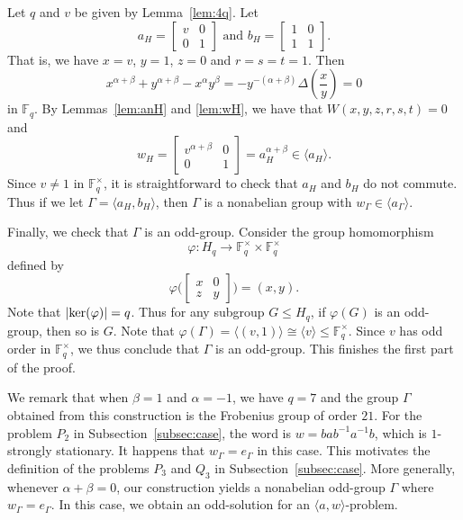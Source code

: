 \documentclass[11pt]{amsart}
\theoremstyle{definition}
\theoremstyle{definition}
\numberwithin{equation}{section}
\begin{document}
Let $q$ and $v$ be given by Lemma~\ref{lem:4q}. Let 
\begin{equation} a_H=\left[\begin{array}{cc} v& 0 \\ 0 & 1\end{array}\right] \mbox{ and } b_H=\left[\begin{array}{cc} 1 & 0 \\ 1 & 1\end{array}\right]. \end{equation}
That is, we have $x=v$, $y=1$, $z=0$ and $r=s=t=1$. Then
$$ x^{\alpha+\beta}+y^{\alpha+\beta}-x^\alpha y^\beta=-y^{-(\alpha+\beta)}\Delta\left(\frac{x}{y}\right)=0$$
in $\mathbb{F}_q$. By Lemmas~\ref{lem:anH} and \ref{lem:wH}, we have that $W(x,y,z,r,s,t)=0$ and
$$ w_H=\left[\begin{array}{cc} v^{\alpha+\beta} & 0 \\ 0 & 1\end{array}\right]=a_H^{\alpha+\beta}\in \langle a_H\rangle. $$
Since $v\neq 1$ in $\mathbb{F}_q^\times$, it is straightforward to check that $a_H$ and $b_H$ do not commute. Thus if we let $\Gamma=\langle a_H, b_H\rangle$, then $\Gamma$ is a nonabelian group with $w_\Gamma\in \langle a_\Gamma\rangle$. 

Finally, we check that $\Gamma$ is an odd-group. Consider the group homomorphism
$$ \varphi\colon H_q\to \mathbb{F}_q^\times\times \mathbb{F}_q^\times $$
defined by
$$ \varphi\Big( \left[\begin{array}{cc} x & 0 \\ z & y\end{array}\right]\Big)=(x, y). $$
Note that $|\mbox{\rm ker}(\varphi)|=q$. Thus for any subgroup $G\leq H_q$, if $\varphi(G)$ is an odd-group, then so is $G$.  Note that $\varphi(\Gamma)=\langle (v, 1)\rangle\cong \langle v\rangle \leq \mathbb{F}_q^\times$. Since $v$ has odd order in $\mathbb{F}_q^\times$, we thus conclude that $\Gamma$ is an odd-group. This finishes the first part of the proof. 

We remark that when $\beta=1$ and $\alpha=-1$, we have $q=7$ and the group $\Gamma$ obtained from this construction is the Frobenius group of order $21$. For the problem $P_2$ in Subsection~\ref{subsec:case}, the word is $w=bab^{-1}a^{-1}b$, which is $1$-strongly stationary. It happens that $w_\Gamma=e_\Gamma$ in this case. This motivates the definition of the problems $P_3$ and $Q_3$ in Subsection~\ref{subsec:case}. More generally, whenever $\alpha+\beta=0$, our construction yields a nonabelian odd-group $\Gamma$ where $w_\Gamma=e_\Gamma$. In this case, we obtain an odd-solution for an $\langle a, w\rangle$-problem.
\end{document}
